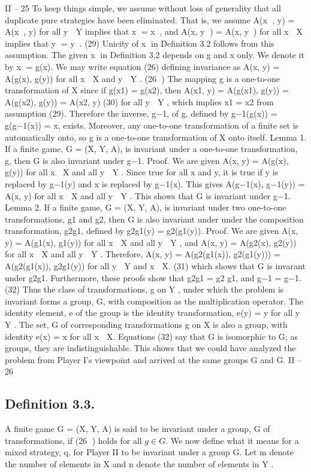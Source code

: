 \documentclass[]{report}
\begin{document}
II – 25
To keep things simple, we assume without loss of generality that all duplicate pure
strategies have been eliminated. That is, we assume
A(x
, y) = A(x, y) for all y ∈ Y implies that x = x, and
A(x, y
) = A(x, y) for all x ∈ X implies that y = y. (29)
Unicity of x in Definition 3.2 follows from this assumption.
The given x in Definition 3.2 depends on g and x only. We denote it by x = g(x).
We may write equation (26) defining invariance as
A(x, y) = A(g(x), g(y)) for all x ∈ X and y ∈ Y . (26
)
The mapping g is a one-to-one transformation of X since if g(x1) = g(x2), then
A(x1, y) = A(g(x1), g(y)) = A(g(x2), g(y)) = A(x2, y) (30)
for all y ∈ Y , which implies x1 = x2 from assumption (29). Therefore the inverse, g−1, of
g, defined by g−1(g(x)) = g(g−1(x)) = x, exists. Moreover, any one-to-one transformation
of a finite set is automatically onto, so g is a one-to-one transformation of X onto itself.
Lemma 1. If a finite game, G = (X, Y, A), is invariant under a one-to-one transformation,
g, then G is also invariant under g−1.
Proof. We are given A(x, y) = A(g(x), g(y)) for all x ∈ X and all y ∈ Y . Since true for
all x and y, it is true if y is replaced by g−1(y) and x is replaced by g−1(x). This gives
A(g−1(x), g−1(y)) = A(x, y) for all x ∈ X and all y ∈ Y . This shows that G is invariant
under g−1.
Lemma 2. If a finite game, G = (X, Y, A), is invariant under two one-to-one transformations,
g1 and g2, then G is also invariant under under the composition transformation,
g2g1, defined by g2g1(y) = g2(g1(y)).
Proof. We are given A(x, y) = A(g1(x), g1(y)) for all x ∈ X and all y ∈ Y , and A(x, y) =
A(g2(x), g2(y)) for all x ∈ X and all y ∈ Y . Therefore,
A(x, y) = A(g2(g1(x)), g2(g1(y))) = A(g2(g1(x)), g2g1(y)) for all y ∈ Y and x ∈ X.
(31)
which shows that G is invarant under g2g1.
Furthermore, these proofs show that
g2g1 = g2 g1, and g−1 = g−1. (32)
Thus the class of transformations, g on Y , under which the problem is invariant forms a
group, G, with composition as the multiplication operator. The identity element, e of the
group is the identity transformation, e(y) = y for all y ∈ Y . The set, G of corresponding
transformations g on X is also a group, with identity e(x) = x for all x ∈ X. Equations
(32) say that G is isomorphic to G; as groups, they are indistinguishable.
This shows that we could have analyzed the problem from Player I’s viewpoint and
arrived at the same groups G and G.
II – 26
\subsection{Definition 3.3.} A finite game G = (X, Y, A) is said to be invariant under a group, G of
transformations, if (26
) holds for all $g \in G$.
We now define what it means for a mixed strategy, q, for Player II to be invariant
under a group G. Let m denote the number of elements in X and n denote the number of
elements in Y .
\end{document}
